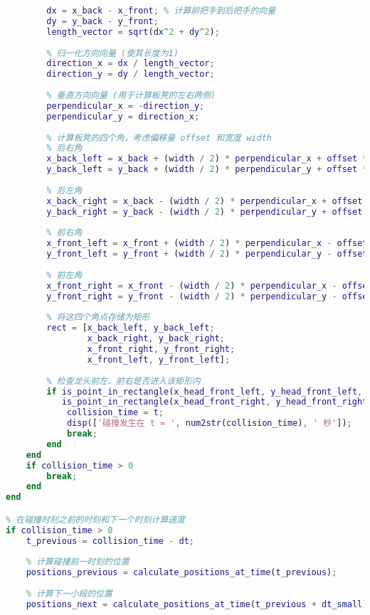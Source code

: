 \documentclass[withoutpreface,bwprint]{cumcmthesis1} %
\begin{document}
\begin{appendices}
\begin{lstlisting}[language=matlab]
        % 计算板凳的方向向量 (dx, dy)
        dx = x_back - x_front; % 计算前把手到后把手的向量
        dy = y_back - y_front;
        length_vector = sqrt(dx^2 + dy^2);
        
        % 归一化方向向量 (使其长度为1)
        direction_x = dx / length_vector;
        direction_y = dy / length_vector;
        
        % 垂直方向向量 (用于计算板凳的左右两侧)
        perpendicular_x = -direction_y;
        perpendicular_y = direction_x;
        
        % 计算板凳的四个角，考虑偏移量 offset 和宽度 width
        % 后右角
        x_back_left = x_back + (width / 2) * perpendicular_x + offset * direction_x;
        y_back_left = y_back + (width / 2) * perpendicular_y + offset * direction_y;
        
        % 后左角
        x_back_right = x_back - (width / 2) * perpendicular_x + offset * direction_x;
        y_back_right = y_back - (width / 2) * perpendicular_y + offset * direction_y;
        
        % 前右角
        x_front_left = x_front + (width / 2) * perpendicular_x - offset * direction_x;
        y_front_left = y_front + (width / 2) * perpendicular_y - offset * direction_y;
        
        % 前左角
        x_front_right = x_front - (width / 2) * perpendicular_x - offset * direction_x;
        y_front_right = y_front - (width / 2) * perpendicular_y - offset * direction_y;
        
        % 将这四个角点存储为矩形
        rect = [x_back_left, y_back_left;
                x_back_right, y_back_right;
                x_front_right, y_front_right;
                x_front_left, y_front_left];
        
        % 检查龙头前左、前右是否进入该矩形内
        if is_point_in_rectangle(x_head_front_left, y_head_front_left, rect) || ...
           is_point_in_rectangle(x_head_front_right, y_head_front_right, rect)
            collision_time = t;
            disp(['碰撞发生在 t = ', num2str(collision_time), ' 秒']);
            break;
        end
    end
    if collision_time > 0
        break;
    end
end

% 在碰撞时刻之前的时刻和下一个时刻计算速度
if collision_time > 0
    t_previous = collision_time - dt;
    
    % 计算碰撞前一时刻的位置
    positions_previous = calculate_positions_at_time(t_previous);
    
    % 计算下一小段的位置
    positions_next = calculate_positions_at_time(t_previous + dt_small);
    

\end{lstlisting}
\end{appendices}
\end{document}
